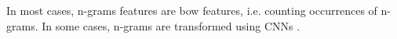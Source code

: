 In most cases, n-grams features are \ac{bow} features, i.e. counting occurrences of n-grams.
In some cases, n-grams are transformed using CNNs \citep{tyo_state_2022}.